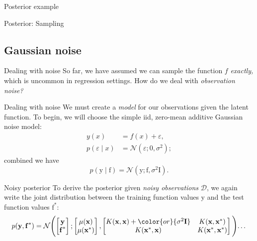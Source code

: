 \documentclass[xcolor={dvipsnames},hyperref={breaklinks=true},12pt]{beamer}
\newcommand{\given}{\mid}
\newcommand{\mc}[1]{\mathcal{#1}}
\newcommand{\data}{\mc{D}}
\newcommand{\mat}[1]{\bm{\mathrm{#1}}}
\renewcommand{\vec}[1]{\bm{\mathrm{#1}}}
\newcommand{\emphr}[1]{{\textcolor{or}{\itshape #1}}}
\newcommand{\maker}[1]{{\color{or}{#1}}}
\begin{document}
\begin{frame}{Posterior example}
  \hspace*{-1.5em}
\end{frame}

\begin{frame}{Posterior: Sampling}
  \hspace*{-1.5em}
\end{frame}

\subsection{Gaussian noise}

\begin{frame}{Dealing with noise}
  So far, we have assumed we can sample the function $f$
  \emphr{exactly,} which is uncommon in regression settings.  How do
  we deal with \emphr{observation noise?}
\end{frame}

\begin{frame}{Dealing with noise}
  We must create a \emphr{model} for our observations given the latent
  function.  To begin, we will choose the simple iid, zero-mean
  additive Gaussian noise model:
  \begin{align*}
    y(x) &= f(x) + \varepsilon,
    \\ p(\varepsilon \given x) &= \mc{N}(\varepsilon; 0, \sigma^2);
  \end{align*}
  combined we have
  \begin{equation*}
    p(\vec{y} \given \vec{f}) = \mc{N}(\vec{y}; \vec{f}, \sigma^2\mat{I}).
  \end{equation*}
\end{frame}

\begin{frame}{Noisy posterior}
  To derive the posterior given \emphr{noisy observations} $\data$, we
  again write the joint distribution between the training function
  values $\vec{y}$ and the test function values $\vec{f}^\ast$:
  \begin{equation}
    p(\vec{y}, \vec{f}^\ast) =
    \mc{N}\Biggl(
    \begin{bmatrix} \vec{y} \\ \vec{f}^\ast \end{bmatrix};
    \begin{bmatrix} \mu(\vec{x}) \\ \mu(\vec{x}^\ast) \end{bmatrix},
    \begin{bmatrix} K(\vec{x}, \vec{x}) + \maker{\sigma^2 \vec{I}} & K(\vec{x}, \vec{x}^\ast) \\ K(\vec{x}^\ast, \vec{x}) & K(\vec{x}^\ast, \vec{x}^\ast) \end{bmatrix}
    \Biggl)\dotsc
  \end{equation}
\end{frame}
\end{document}
